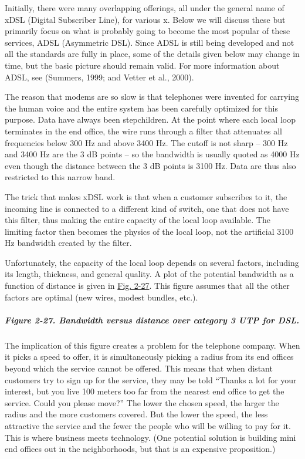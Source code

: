 Initially, there were many overlapping offerings, all under the general
name of {xDSL} ({Digital Subscriber Line}), for various {x}. Below we
will discuss these but primarily focus on what is probably going to
become the most popular of these services, {ADSL} ({Asymmetric DSL}).
Since ADSL is still being developed and not all the standards are fully
in place, some of the details given below may change in time, but the
basic picture should remain valid. For more information about ADSL, see
(Summers, 1999; and Vetter et al., 2000).

The reason that modems are so slow is that telephones were invented for
carrying the human voice and the entire system has been carefully
optimized for this purpose. Data have always been stepchildren. At the
point where each local loop terminates in the end office, the wire runs
through a filter that attenuates all frequencies below 300 Hz and above
3400 Hz. The cutoff is not sharp -- 300 Hz and 3400 Hz are the 3 dB
points -- so the bandwidth is usually quoted as 4000 Hz even though the
distance between the 3 dB points is 3100 Hz. Data are thus also
restricted to this narrow band.

The trick that makes xDSL work is that when a customer subscribes to it,
the incoming line is connected to a different kind of switch, one that
does not have this filter, thus making the entire capacity of the local
loop available. The limiting factor then becomes the physics of the
local loop, not the artificial 3100 Hz bandwidth created by the filter.

Unfortunately, the capacity of the local loop depends on several
factors, including its length, thickness, and general quality. A plot of
the potential bandwidth as a function of distance is given in
\protect\hyperlink{0130661023_ch02lev1sec5.htmlux5cux23ch02fig27}{Fig.
2-27}. This figure assumes that all the other factors are optimal (new
wires, modest bundles, etc.).

\subparagraph[Figure 2-27. Bandwidth versus distance over category 3 UTP
for
DSL.]{\texorpdfstring{\protect\hypertarget{0130661023_ch02lev1sec5.htmlux5cux23ch02fig27}{}{}Figure
2-27. Bandwidth versus distance over category 3 UTP for
DSL.}{Figure 2-27. Bandwidth versus distance over category 3 UTP for DSL.}}


The implication of this figure creates a problem for the telephone
company. When it picks a speed to offer, it is simultaneously picking a
radius from its end offices beyond which the service cannot be offered.
This means that when distant customers try to sign up for the service,
they may be told ``Thanks a lot for your interest, but you live 100
meters too far from the nearest end office to get the service. Could you
please move?'' The lower the chosen speed, the larger the radius and the
more customers covered. But the lower the speed, the less attractive the
service and the fewer the people who will be willing to pay for it. This
is where business meets technology. (One potential solution is building
mini end offices out in the neighborhoods, but that is an expensive
proposition.)

